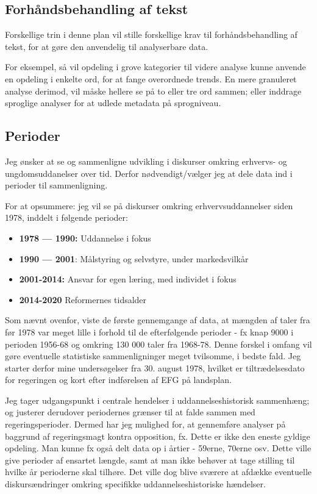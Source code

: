 \subsection{Forhåndsbehandling af tekst}

Forskellige trin i denne plan vil stille forskellige krav til forhåndsbehandling af tekst, for at gøre den anvendelig til analyserbare data.

For eksempel, så vil opdeling i grove kategorier til videre analyse kunne anvende en opdeling i enkelte ord, for at fange overordnede trends.
En mere granuleret analyse derimod, vil måske hellere se på to eller tre ord sammen; eller inddrage sproglige analyser for at udlede metadata på sprogniveau.


\subsection{Perioder}\label{sec:periods}
Jeg ønsker at se og sammenligne udvikling i diskurser omkring erhvervs- og ungdomsuddanelser over tid.
Derfor nødvendigt/vælger jeg at dele data ind i perioder til sammenligning.

For at opsummere: jeg vil se på diskurser omkring erhvervsuddannelser siden 1978, inddelt i følgende perioder:

\begin{itemize}
  \item
    \textbf{1978 — 1990:} Uddannelse i fokus
  \item
    \textbf{1990 — 2001}: Målstyring og selvstyre, under markedsvilkår
  \item
    \textbf{2001-2014:} Ansvar for egen læring, med individet i fokus
  \item
    \textbf{2014-2020} Reformernes tidsalder
\end{itemize}

Som nævnt ovenfor, viste de første gennemgange af data, at mængden af taler fra før 1978 var meget lille i forhold til de efterfølgende perioder - fx knap 9000 i perioden 1956-68 og omkring 130 000 taler fra 1968-78.
Denne forskel i omfang vil gøre eventuelle statistiske sammenligninger meget tvilsomme, i bedste fald.
Jeg starter derfor mine undersøgelser fra 30. august 1978, hvilket er tiltrædelsesdato for regeringen og kort efter indførelsen af EFG på landsplan.

Jeg tager udgangspunkt i centrale hendelser i uddannelseshistorisk sammenhæng; og justerer derudover periodernes grænser til at falde sammen med regeringsperioder.
Dermed har jeg mulighed for, at gennemføre analyser på baggrund af regeringsmagt kontra opposition, fx.
Dette er ikke den eneste gyldige opdeling.
Man kunne fx også delt data op i årtier - 59erne, 70erne osv.
Dette ville give perioder af ensartet længde, samt at man ikke behøver at tage stilling til hvilke år perioderne skal tilhøre.
Det ville dog blive sværere at afdække eventuelle diskursændringer omkring specifikke uddannelseshistoriske hændelser.


